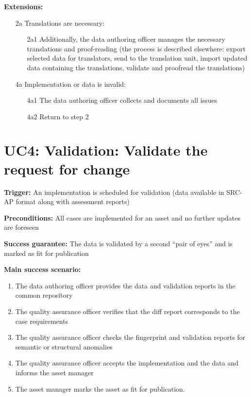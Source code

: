 	\textbf{Extensions:}
	\begin{enumerate}
		\item [2a] Translations are necessary:
		\begin{enumerate}
			\item [2a1] Additionally, the data authoring officer manages the necessary translations and proof-reading (the process is described elsewhere: export selected data for translators, send to the translation unit, import updated data containing the translations, validate and proofread the translations)			
		\end{enumerate}
		\item [4a] Implementation or data is invalid:
		\begin{enumerate}
			\item [4a1] The data authoring officer collects and documents all issues 
			\item [4a2] Return to step 2			
		\end{enumerate}
	\end{enumerate}
	
	\section{UC4: Validation: Validate the request for change}
	\label{sec:uc4}
	
	\textbf{Trigger:} An implementation is scheduled for validation (data available in SRC-AP \citep{src-ap-vb3} format along with assessment reports)
	
	\textbf{Preconditions:} All cases are implemented for an asset and no further updates are foreseen
	
	\textbf{Success guarantee:} The data is validated by a second ``pair of eyes'' and is marked as fit for publication
	
	\textbf{Main success scenario:} 
	
	\begin{enumerate}
		\item The data authoring officer provides the data and validation reports in the common repository 
		\item The quality assurance officer verifies that the diff report corresponds to the case requirements
		\item The quality assurance officer checks the fingerprint and validation reports for semantic or structural anomalies
		\item The quality assurance officer accepts the implementation and the data and informs the asset manager
		\item The asset manager marks the asset as fit for publication.
		
	\end{enumerate}
	
